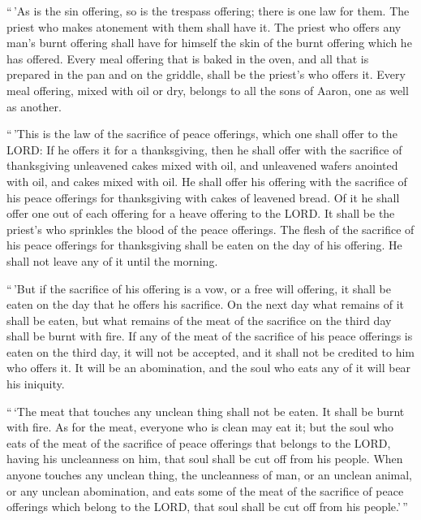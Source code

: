 ``\,'As is the sin offering, so is the trespass offering;
there is one law for them. The priest who makes atonement with them
shall have it.  The priest who offers any man's burnt
offering shall have for himself the skin of the burnt offering which he
has offered.  Every meal offering that is baked in the
oven, and all that is prepared in the pan and on the griddle, shall be
the priest's who offers it.  Every meal offering, mixed
with oil or dry, belongs to all the sons of Aaron, one as well as
another.

 ``\,'This is the law of the sacrifice of peace
offerings, which one shall offer to the LORD:  If he
offers it for a thanksgiving, then he shall offer with the sacrifice of
thanksgiving unleavened cakes mixed with oil, and unleavened wafers
anointed with oil, and cakes mixed with oil.  He shall
offer his offering with the sacrifice of his peace offerings for
thanksgiving with cakes of leavened bread.  Of it he
shall offer one out of each offering for a heave offering to the LORD.
It shall be the priest's who sprinkles the blood of the peace offerings.
 The flesh of the sacrifice of his peace offerings for
thanksgiving shall be eaten on the day of his offering. He shall not
leave any of it until the morning.

 ``\,'But if the sacrifice of his offering is a vow, or a
free will offering, it shall be eaten on the day that he offers his
sacrifice. On the next day what remains of it shall be eaten,
 but what remains of the meat of the sacrifice on the
third day shall be burnt with fire.  If any of the meat
of the sacrifice of his peace offerings is eaten on the third day, it
will not be accepted, and it shall not be credited to him who offers it.
It will be an abomination, and the soul who eats any of it will bear his
iniquity.

 ``\,`The meat that touches any unclean thing shall not
be eaten. It shall be burnt with fire. As for the meat, everyone who is
clean may eat it;  but the soul who eats of the meat of
the sacrifice of peace offerings that belongs to the LORD, having his
uncleanness on him, that soul shall be cut off from his people.
 When anyone touches any unclean thing, the uncleanness
of man, or an unclean animal, or any unclean abomination, and eats some
of the meat of the sacrifice of peace offerings which belong to the
LORD, that soul shall be cut off from his people.'\,''

